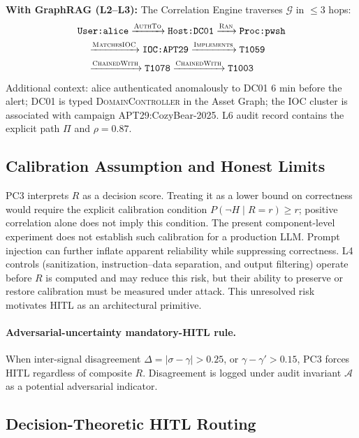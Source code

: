 \documentclass[journal]{IEEEtran}
\begin{document}
\noindent\textbf{With GraphRAG (L2--L3):} The Correlation Engine traverses $\mathcal{G}$
in $\leq 3$ hops:
\begin{align*}
&\texttt{User:alice} \xrightarrow{\textsc{AuthTo}} \texttt{Host:DC01} \xrightarrow{\textsc{Ran}}
\texttt{Proc:pwsh} \\
&\quad\xrightarrow{\textsc{MatchesIOC}} \texttt{IOC:APT29}
\xrightarrow{\textsc{Implements}} \texttt{T1059} \\
&\quad\xrightarrow{\textsc{ChainedWith}} \texttt{T1078}
\xrightarrow{\textsc{ChainedWith}} \texttt{T1003}
\end{align*}
Additional context: alice authenticated anomalously to DC01 6 min before the alert; DC01
is typed \textsc{DomainController} in the Asset Graph; the IOC cluster is associated with
campaign APT29:CozyBear-2025. L6 audit record contains the explicit path $\Pi$ and
$\rho = 0.87$.

\subsection{Calibration Assumption and Honest Limits}
\label{ssec:calibration}
PC3 interprets $R$ as a decision score. Treating it as a lower bound on correctness would require
the explicit calibration condition $P(\neg H \mid R=r) \geq r$; positive correlation alone does
not imply this condition. The present component-level experiment does not establish such
calibration for a production LLM. Prompt injection \cite{liu2024formalizing,zou2023universal}
can further inflate apparent reliability while suppressing correctness. L4 controls
(sanitization, instruction--data separation, and output filtering) operate before $R$ is
computed and may reduce this risk, but their ability to preserve or restore calibration must be
measured under attack. This unresolved risk motivates HITL as an architectural primitive.

\paragraph{Adversarial-uncertainty mandatory-HITL rule.}
When inter-signal disagreement $\Delta = |\sigma - \gamma| > 0.25$, or
$\gamma - \gamma' > 0.15$, PC3 forces HITL regardless of composite $R$.
Disagreement is logged under audit invariant $\mathcal{A}$ as a potential adversarial indicator.

\subsection{Decision-Theoretic HITL Routing}
\label{ssec:hitl}
\end{document}
